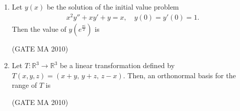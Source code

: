 \documentclass[journal,12pt,onecolumn]{IEEEtran}
\theoremstyle{remark}
\begin{document}
\begin{flushleft}
\begin{enumerate}
\begin{enumerate}
\end{enumerate}
\item Let $y(x)$ be the solution of the initial value problem
\begin{align*}
x^2y''+xy'+y=x,\quad y(0)=y'(0)=1.
\end{align*}
Then the value of $y(e^{\tfrac{\pi i}{2}})$ is \underline{\hspace{2cm}}

\hfill(GATE MA 2010)

\begin{enumerate}
\end{enumerate}

\item Let $T:\mathbb{R}^3\to\mathbb{R}^3$ be a linear transformation defined by $T(x,y,z)=(x+y,\,y+z,\,z-x)$. Then, an orthonormal basis for the range of $T$ is \underline{\hspace{2cm}}

\hfill(GATE MA 2010)

\begin{enumerate}
\end{enumerate}
\end{enumerate}
\end{flushleft}
\end{document}
